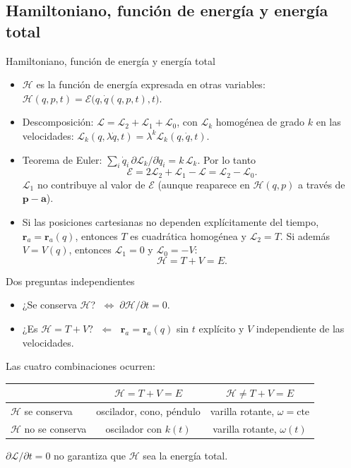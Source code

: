 \documentclass[spanish]{beamer}
\newcommand{\Lag}{\mathcal{L}}               %
\newcommand{\Ham}{\mathcal{H}}               %
\newcommand{\Ene}{\mathcal{E}}               %
\newcommand{\cte}{\text{cte}}
\begin{document}
\subsection{Hamiltoniano, función de energía y energía total}
\begin{frame}{Hamiltoniano, función de energía y energía total}
\begin{itemize}[<+->]
  \item $\Ham$ es la función de energía expresada en otras variables:
        $\Ham(q,p,t)=\Ene\big(q,\dot q(q,p,t),t\big)$.
  \item Descomposición: $\Lag=\Lag_2+\Lag_1+\Lag_0$, con $\Lag_k$ homogénea de grado $k$
        en las velocidades: $\Lag_k(q,\lambda\dot q,t)=\lambda^k\Lag_k(q,\dot q,t)$.
  \item Teorema de Euler: $\sum_i\dot q_i\,\partial\Lag_k/\partial\dot q_i=k\,\Lag_k$. Por lo tanto
        \[
          \Ene=2\Lag_2+\Lag_1-\Lag=\Lag_2-\Lag_0 .
        \]
        $\Lag_1$ no contribuye al valor de $\Ene$ (aunque reaparece en
        $\Ham(q,p)$ a través de $\mathbf p-\mathbf a$).
  \item Si las posiciones cartesianas no dependen explícitamente del tiempo,
        $\mathbf r_a=\mathbf r_a(q)$, entonces $T$ es cuadrática homogénea y $\Lag_2=T$.
        Si además $V=V(q)$, entonces $\Lag_1=0$ y $\Lag_0=-V$:
        \[
          \Ham=T+V=E .
        \]
\end{itemize}
\end{frame}

\begin{frame}{Dos preguntas independientes}
\begin{block}{}
\begin{itemize}
  \item ¿Se conserva $\Ham$? $\;\Longleftrightarrow\;\partial\Ham/\partial t=0$.
  \item ¿Es $\Ham=T+V$? $\;\Longleftarrow\;$ $\mathbf r_a=\mathbf r_a(q)$ sin $t$ explícito
        y $V$ independiente de las velocidades.
\end{itemize}
\end{block}
\pause
Las cuatro combinaciones ocurren:
\begin{center}
\small
\renewcommand{\arraystretch}{1.3}
\begin{tabular}{@{}lcc@{}}
  \toprule
  & $\Ham=T+V = E$ & $\Ham\neq T+V =E$ \\
  \midrule
  $\Ham$ se conserva    & oscilador, cono, péndulo & varilla rotante, $\omega=\cte$ \\
  $\Ham$ no se conserva & oscilador con $k(t)$     & varilla rotante, $\omega(t)$ \\
  \bottomrule
\end{tabular}
\end{center}
\pause
\alert{$\partial\Lag/\partial t=0$ no garantiza que $\Ham$ sea la energía total.}
\end{frame}
\end{document}

